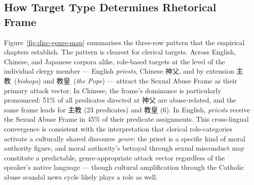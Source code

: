 \documentclass[../CLthesis.tex]{subfiles}
\begin{document}
\subsection{How Target Type Determines Rhetorical Frame}

Figure~\ref{fig:disc-genre-map} summarises the three-row pattern that the empirical chapters establish. The pattern is clearest for clerical targets. Across English, Chinese, and Japanese corpora alike, role-based targets at the level of the individual clergy member --- English \textit{priests}, Chinese 神父, and by extension 主教~(\textit{bishops}) and 教皇~(\textit{the Pope}) --- attract the Sexual Abuse Frame as their primary attack vector. In Chinese, the frame's dominance is particularly pronounced: 51\% of all predicates directed at 神父 are abuse-related, and the same frame leads for 主教 (23 predicates) and 教皇 (6). In English, \textit{priests} receive the Sexual Abuse Frame in 45\% of their predicate assignments. This cross-lingual convergence is consistent with the interpretation that clerical role-categories activate a culturally shared discourse \emph{genre}: the priest is a specific kind of moral authority figure, and moral authority's betrayal through sexual misconduct may constitute a predictable, genre-appropriate attack vector regardless of the speaker's native language --- though cultural amplification through the Catholic abuse scandal news cycle likely plays a role as well.
\end{document}
